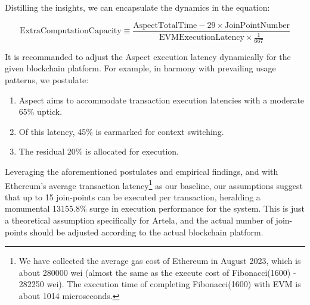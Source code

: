 Distilling the insights, we can encapsulate the dynamics in the equation:

\[
  \text{ExtraComputationCapacity} \equiv \frac{\text{AspectTotalTime} - 29 \times \text{JoinPointNumber}}{\text{EVMExecutionLatency} \times \frac{1}{667}}
\]

\pagebreak

It is recommanded to adjust the Aspect execution latency dynamically for the given blockchain platform. For example, in harmony with prevailing usage patterns, we postulate:

\begin{enumerate}
  \item Aspect aims to accommodate transaction execution latencies with a moderate 65\% uptick.
  \item Of this latency, 45\% is earmarked for context switching.
  \item The residual 20\% is allocated for execution.
\end{enumerate}

Leveraging the aforementioned postulates and empirical findings, and with Ethereum's average transaction latency\footnote{We have collected the average gas cost of Ethereum in August 2023, which is about 280000 wei (almost the same as the execute cost of Fibonacci(1600) - 282250 wei). The execution time of completing Fibonacci(1600) with EVM is about 1014 microseconds.} as our baseline, our assumptions suggest that up to 15 join-points can be executed per transaction, heralding a monumental 13155.8\% surge in execution performance for the system. This is just a theoretical assumption specifically for Artela, and the actual number of join-points should be adjusted according to the actual blockchain platform.
